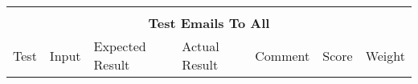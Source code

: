 \documentclass[11pt]{article}
\begin{document}
\begin{sidewaystable}
\begin{tabular}{lllllrr}
                                                                                                                                       &                                                                                                                                                                           &                                                                                                            &                                                                                                            &                                                                                                                                                                                              & \multicolumn{1}{l}{}       & \multicolumn{1}{l}{}        \\
        \multicolumn{7}{c}{\textbf{Test Emails To All}}                                                                                                                                                                                                                                                                                                                                                                                                                                                                                                                                                                                                                                                                                                                                                \\ \hline
        \multicolumn{1}{|l|}{Test}                                                                                                     & \multicolumn{1}{l|}{Input}                                                                                                                                                & \multicolumn{1}{l|}{Expected Result}                                                                       & \multicolumn{1}{l|}{Actual Result}                                                                         & \multicolumn{1}{l|}{Comment}                                                                                                                                                                 & \multicolumn{1}{l|}{Score} & \multicolumn{1}{l|}{Weight} \\ \hline

\end{tabular}
\end{sidewaystable}
\end{document}
